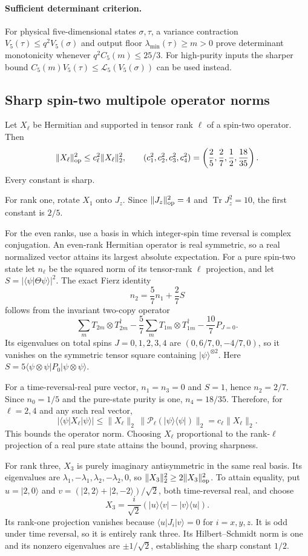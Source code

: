 \documentclass[11pt,a4paper]{article}
\begin{document}
\paragraph{Sufficient determinant criterion.}
For physical five-dimensional states $\sigma,\tau$, a variance contraction
$V_5(\tau)\le q^2V_5(\sigma)$ and output floor
$\lambda_{\min}(\tau)\ge m>0$ prove determinant monotonicity whenever
$q^2 C_5(m)\le25/3$. For high-purity inputs the sharper bound
$C_5(m)V_5(\tau)\le\mathcal L_5(V_5(\sigma))$ can be used instead.


\subsection{Sharp spin-two multipole operator norms}
Let $X_\ell$ be Hermitian and supported in tensor rank $\ell$ of a spin-two
operator. Then
\[
 \|X_\ell\|_{\rm op}^2\le c_\ell^2\|X_\ell\|_2^2,
 \qquad
 (c_1^2,c_2^2,c_3^2,c_4^2)
 =\left(\frac25,\frac27,\frac12,\frac{18}{35}\right).
\]
Every constant is sharp.

For rank one, rotate $X_1$ onto $J_z$. Since
$\|J_z\|_{\rm op}^2=4$ and $\operatorname{Tr}J_z^2=10$, the first constant
is $2/5$.

For the even ranks, use a basis in which integer-spin time reversal is
complex conjugation. An even-rank Hermitian operator is real symmetric,
so a real normalized vector attains its largest absolute expectation.
For a pure spin-two state let $n_\ell$ be the squared norm of its tensor-rank
$\ell$ projection, and let $S=|\langle\psi|\Theta\psi\rangle|^2$.
The exact Fierz identity
\[
 n_2=\frac57 n_1+\frac27 S
\]
follows from the invariant two-copy operator
\[
 \sum_m T_{2m}\otimes T_{2m}^\dagger
 -\frac57\sum_m T_{1m}\otimes T_{1m}^\dagger-\frac{10}{7}P_{J=0}.
\]
Its eigenvalues on total spins $J=0,1,2,3,4$ are
$(0,6/7,0,-4/7,0)$, so it vanishes on the symmetric tensor square containing
$|\psi\rangle^{\otimes2}$. Here
$S=5\langle\psi\otimes\psi|P_0|\psi\otimes\psi\rangle$.

For a time-reversal-real pure vector, $n_1=n_3=0$ and $S=1$, hence
$n_2=2/7$. Since $n_0=1/5$ and the pure-state purity is one,
$n_4=18/35$. Therefore, for $\ell=2,4$ and any such real vector,
\[
 |\langle\psi|X_\ell|\psi\rangle|
 \le\|X_\ell\|_2\,\|\mathcal P_\ell(|\psi\rangle\langle\psi|)\|_2
 =c_\ell\|X_\ell\|_2.
\]
This bounds the operator norm. Choosing $X_\ell$ proportional to the
rank-$\ell$ projection of a real pure state attains the bound, proving
sharpness.

For rank three, $X_3$ is purely imaginary antisymmetric in the same real
basis. Its eigenvalues are $\lambda_1,-\lambda_1,\lambda_2,-\lambda_2,0$,
so $\|X_3\|_2^2\ge2\|X_3\|_{\rm op}^2$.
To attain equality, put $u=|2,0\rangle$ and
$v=(|2,2\rangle+|2,-2\rangle)/\sqrt2$, both time-reversal real, and choose
\[
 X_3=\frac{i}{\sqrt2}(|u\rangle\langle v|-|v\rangle\langle u|).
\]
Its rank-one projection vanishes because $\langle u|J_i|v\rangle=0$ for
$i=x,y,z$. It is odd under time reversal, so it is entirely rank three.
Its Hilbert--Schmidt norm is one and its nonzero eigenvalues are
$\pm1/\sqrt2$, establishing the sharp constant $1/2$.
\end{document}
